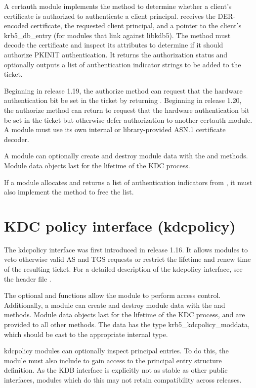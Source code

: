 \documentclass[letterpaper,10pt,english]{sphinxmanual}
\begin{document}
A certauth module implements the  method to determine
whether a client’s certificate is authorized to authenticate a client
principal.   receives the DER-encoded certificate, the
requested client principal, and a pointer to the client’s
krb5\_db\_entry (for modules that link against libkdb5).  The method
must decode the certificate and inspect its attributes to determine if
it should authorize PKINIT authentication.  It returns the
authorization status and optionally outputs a list of authentication
indicator strings to be added to the ticket.

Beginning in release 1.19, the authorize method can request that the
hardware authentication bit be set in the ticket by returning
.  Beginning in release 1.20, the authorize
method can return  to request that the
hardware authentication bit be set in the ticket but otherwise defer
authorization to another certauth module.  A module must use its own
internal or library-provided ASN.1 certificate decoder.

A module can optionally create and destroy module data with the
 and  methods.  Module data objects last for the
lifetime of the KDC process.

If a module allocates and returns a list of authentication indicators
from , it must also implement the  method
to free the list.


\section{KDC policy interface (kdcpolicy)}
\label{\detokenize{plugindev/kdcpolicy:kdcpolicy-plugin}}\label{\detokenize{plugindev/kdcpolicy::doc}}\label{\detokenize{plugindev/kdcpolicy:kdc-policy-interface-kdcpolicy}}
The kdcpolicy interface was first introduced in release 1.16.  It
allows modules to veto otherwise valid AS and TGS requests or restrict
the lifetime and renew time of the resulting ticket.  For a detailed
description of the kdcpolicy interface, see the header file
.

The optional  and  functions allow the module
to perform access control.  Additionally, a module can create and
destroy module data with the  and  methods.  Module
data objects last for the lifetime of the KDC process, and are
provided to all other methods.  The data has the type
krb5\_kdcpolicy\_moddata, which should be cast to the appropriate
internal type.

kdcpolicy modules can optionally inspect principal entries.  To do
this, the module must also include  to gain access to the
principal entry structure definition.  As the KDB interface is
explicitly not as stable as other public interfaces, modules which do
this may not retain compatibility across releases.



\renewcommand{\indexname}{Index}
\printindex
\end{document}
